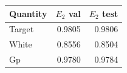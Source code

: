 \begin{tabular}{lrr}
\toprule
Quantity & $E_2$ val & $E_2$ test \\
\midrule
Target & 0.9805 & 0.9806 \\
White & 0.8556 & 0.8504 \\
Gp & 0.9780 & 0.9784 \\
\bottomrule
\end{tabular}
